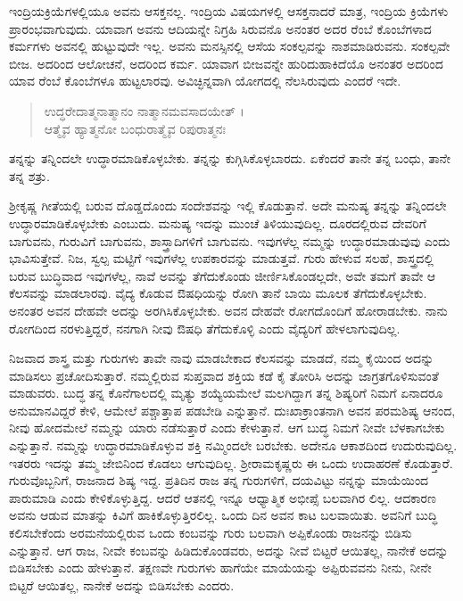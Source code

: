 ಇಂದ್ರಿಯಕ್ರಿಯೆಗಳಲ್ಲಿಯೂ ಅವನು ಆಸಕ್ತನಲ್ಲ. ಇಂದ್ರಿಯ ವಿಷಯಗಳಲ್ಲಿ ಆಸಕ್ತನಾದರೆ ಮಾತ್ರ, ಇಂದ್ರಿಯ ಕ್ರಿಯೆಗಳು ಪ್ರಾರಂಭವಾಗುವುದು. ಯಾವಾಗ ಅವನು ಆದಿಯನ್ನೇ ನಿಗ್ರಹಿ ಸಿರುವನೊ ಅನಂತರ ಅದರ ರೆಂಬೆ ಕೊಂಬೆಗಳಾದ ಕರ್ಮಗಳು ಅವನಲ್ಲಿ ಹುಟ್ಟುವುದೇ ಇಲ್ಲ. ಅವನು ಮನಸ್ಸಿನಲ್ಲಿ ಆಸೆಯ ಸಂಕಲ್ಪವನ್ನು ನಾಶಮಾಡಿರುವನು. ಸಂಕಲ್ಪವೇ ಬೀಜ. ಅದರಿಂದ ಆಲೋಚನೆ, ಅದರಿಂದ ಕರ್ಮ. ಯಾವಾಗ ಬೀಜವನ್ನೇ ಹುರಿದುಹಾಕಿದೆಯೊ ಅನಂತರ ಅದರಿಂದ ಯಾವ ರೆಂಬೆ ಕೊಂಬೆಗಳೂ ಹುಟ್ಟಲಾರವು. ಅವಿಚ್ಛಿನ್ನವಾಗಿ ಯೋಗದಲ್ಲಿ ನೆಲಸಿರುವುದು ಎಂದರೆ ಇದೇ.

\begin{verse}
ಉದ್ಧರೇದಾತ್ಮನಾತ್ಮಾನಂ ನಾತ್ಮಾನಮವಸಾದಯೇತ್ ।\\ಆತ್ಮೈವ ಹ್ಯಾತ್ಮನೋ ಬಂಧುರಾತ್ಮೈವ ರಿಪುರಾತ್ಮನಃ 
\end{verse}

{\small ತನ್ನನ್ನು ತನ್ನಿಂದಲೇ ಉದ್ಧಾರಮಾಡಿಕೊಳ್ಳಬೇಕು. ತನ್ನನ್ನು ಕುಗ್ಗಿಸಿಕೊಳ್ಳಬಾರದು. ಏಕೆಂದರೆ ತಾನೇ ತನ್ನ ಬಂಧು, ತಾನೇ ತನ್ನ ಶತ್ರು.}

ಶ್ರೀಕೃಷ್ಣ ಗೀತೆಯಲ್ಲಿ ಬರುವ ದೊಡ್ಡದೊಂದು ಸಂದೇಶವನ್ನು ಇಲ್ಲಿ ಕೊಡುತ್ತಾನೆ. ಅದೇ ಮನುಷ್ಯ ತನ್ನನ್ನು ತನ್ನಿಂದಲೇ ಉದ್ಧಾರಮಾಡಿಕೊಳ್ಳಬೇಕು ಎಂಬುದು. ಮನುಷ್ಯ ಇದನ್ನು ಮುಂಚೆ ತಿಳಿಯುವುದಿಲ್ಲ. ದೂರದಲ್ಲಿರುವ ದೇವರಿಗೆ ಬಾಗುವನು, ಗುರುವಿಗೆ ಬಾಗುವನು, ಶಾಸ್ತ್ರಾದಿಗಳಿಗೆ ಬಾಗುವನು. ಇವುಗಳೆಲ್ಲ ನಮ್ಮನ್ನು ಉದ್ಧಾರಮಾಡುವುವು ಎಂದು ಭಾವಿಸುತ್ತೇವೆ. ನಿಜ, ಸ್ವಲ್ಪ ಮಟ್ಟಿಗೆ ಇವುಗಳೆಲ್ಲ ಉಪಕಾರವನ್ನು ಮಾಡುತ್ತವೆ. ಗುರು ಹೇಳುವ ಸಲಹೆ, ಶಾಸ್ತ್ರದಲ್ಲಿ ಬರುವ ಬುದ್ಧಿವಾದ ಇವುಗಳೆಲ್ಲ, ನಾವೆ ಅವನ್ನು ತೆಗೆದುಕೊಂಡು ಜೀರ್ಣಿಸಿಕೊಂಡಲ್ಲದೇ, ಅವೇ ತಮಗೆ ತಾವೇ ಆ ಕೆಲಸವನ್ನು ಮಾಡಲಾರವು. ವೈದ್ಯ ಕೊಡುವ ಔಷಧಿಯನ್ನು ರೋಗಿ ತಾನೆ ಬಾಯಿ ಮೂಲಕ ತೆಗೆದುಕೊಳ್ಳಬೇಕು. ಅನಂತರ ಅವನ ದೇಹವೇ ಅದನ್ನು ಅರಗಿಸಿಕೊಳ್ಳಬೇಕು. ಅವನ ದೇಹವೇ ರೋಗದೊಂದಿಗೆ ಹೋರಾಡಬೇಕು. ನಾನು ರೋಗದಿಂದ ನರಳುತ್ತಿದ್ದರೆ, ನನಗಾಗಿ ನೀವು ಔಷಧಿ ತೆಗೆದುಕೊಳ್ಳಿ ಎಂದು ವೈದ್ಯರಿಗೆ ಹೇಳಲಾಗುವುದಿಲ್ಲ.

ನಿಜವಾದ ಶಾಸ್ತ್ರ ಮತ್ತು ಗುರುಗಳು ತಾವೇ ನಾವು ಮಾಡಬೇಕಾದ ಕೆಲಸವನ್ನು ಮಾಡದೆ, ನಮ್ಮ ಕೈಯಿಂದ ಅದನ್ನು ಮಾಡಿಸಲು ಪ್ರಚೋದಿಸುತ್ತಾರೆ. ನಮ್ಮಲ್ಲಿರುವ ಸುಪ್ತವಾದ ಶಕ್ತಿಯ ಕಡೆ ಕೈ ತೋರಿಸಿ ಅದನ್ನು ಜಾಗ್ರತಗೊಳಿಸುವಂತೆ ಮಾಡುವರು. ಬುದ್ಧ ತನ್ನ ಕೊನೆಗಾಲದಲ್ಲಿ ಮೃತ್ಯು ಶಯ್ಯೆಯಮೇಲೆ ಮಲಗಿದ್ದಾಗ ತನ್ನ ಶಿಷ್ಯರಿಗೆ ನಿಮಗೆ ಏನಾದರೂ ಅನುಮಾನವಿದ್ದರೆ ಕೇಳಿ, ಆಮೇಲೆ ಪಶ್ಚಾತ್ತಾಪ ಪಡಬೇಡಿ ಎನ್ನುತ್ತಾನೆ. ದುಃಖಾಕ್ರಾಂತನಾಗಿ ಅವನ ಪರಮಶಿಷ್ಯ ಆನಂದ, ನೀವು ಹೋದಮೇಲೆ ನಮ್ಮನ್ನು ಯಾರು ನಡೆಸುತ್ತಾರೆ ಎಂದು ಕೇಳುತ್ತಾನೆ. ಆಗ ಬುದ್ಧ ನಿಮಗೆ ನೀವೇ ಬೆಳಕಾಗಬೇಕು ಎನ್ನುತ್ತಾನೆ. ನಮ್ಮನ್ನು ಉದ್ಧಾರಮಾಡಿಕೊಳ್ಳುವ ಶಕ್ತಿ ನಮ್ಮಿಂದಲೇ ಬರಬೇಕು. ಅದೇನೂ ಆಕಾಶದಿಂದ ಉದುರುವುದಿಲ್ಲ. ಇತರರು ಇದನ್ನು ತಮ್ಮ ಜೇಬಿನಿಂದ ಕೊಡಲು ಆಗುವುದಿಲ್ಲ. ಶ್ರೀರಾಮಕೃಷ್ಣರು ಈ ಒಂದು ಉದಾಹರಣೆ ಕೊಡುತ್ತಾರೆ. ಗುರುವೊಬ್ಬನಿಗೆ, ರಾಜನಾದ ಶಿಷ್ಯ ಇದ್ದ. ಪ್ರತಿದಿನ ರಾಜ ತನ್ನ ಗುರುಗಳಿಗೆ, ದಯವಿಟ್ಟು ನನ್ನನ್ನು ಮಾಯೆಯಿಂದ ಪಾರುಮಾಡಿ ಎಂದು ಕೇಳಿಕೊಳ್ಳುತ್ತಿದ್ದ. ಆದರೆ ಆತನಲ್ಲಿ ಇನ್ನೂ ಆಧ್ಯಾತ್ಮಿಕ ಅಭೀಪ್ಸೆ ಬಲವಾಗಿರ ಲಿಲ್ಲ. ಆದಕಾರಣ ಅವನು ಆಡುವ ಮಾತನ್ನು ಕಿವಿಗೆ ಹಾಕಿಕೊಳ್ಳುತ್ತಿರಲಿಲ್ಲ. ಒಂದು ದಿನ ಅವನ ಕಾಟ ಬಲವಾಯಿತು. ಅವನಿಗೆ ಬುದ್ಧಿ ಕಲಿಸಬೇಕೆಂದು ಅರಮನೆಯಲ್ಲಿರುವ ಒಂದು ಕಂಬವನ್ನು ಗುರು ಬಲವಾಗಿ ಅಪ್ಪಿಕೊಂಡು ರಾಜನನ್ನು ಬಿಡಿಸು ಎನ್ನುತ್ತಾನೆ. ಆಗ ರಾಜ, ನೀವೇ ಕಂಬವನ್ನು ಹಿಡಿದುಕೊಂಡವರು, ಅದನ್ನು ನೀವೆ ಬಿಟ್ಟರೆ ಆಯಿತಲ್ಲ, ನಾನೇಕೆ ಅದನ್ನು ಬಿಡಿಸಬೇಕು ಎಂದು ಹೇಳುತ್ತಾನೆ. ತಕ್ಷಣವೇ ಗುರುಗಳು ಹಾಗೆಯೇ ಮಾಯೆಯನ್ನು ಅಪ್ಪಿರುವವನು ನೀನು, ನೀನೇ ಬಿಟ್ಟರೆ ಆಯಿತಲ್ಲ, ನಾನೇಕೆ ಅದನ್ನು ಬಿಡಿಸಬೇಕು ಎಂದರು.

